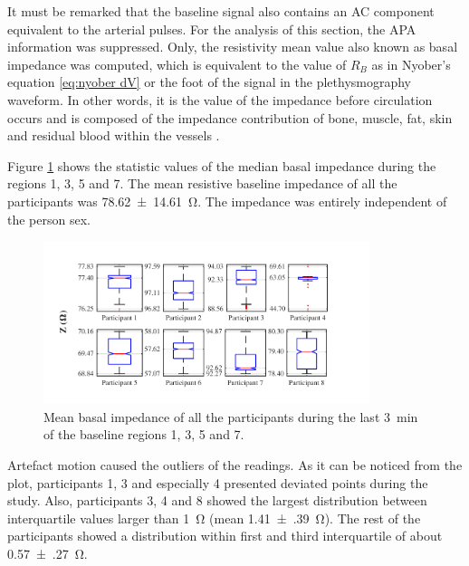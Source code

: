 It must be remarked that the baseline signal also contains an AC component equivalent to the arterial pulses. For the analysis of this section, the APA information was suppressed. Only, the resistivity mean value also known as basal impedance was computed, which is equivalent to the value of $R_B$ as in Nyober's equation \ref{eq:nyober dV} or the foot of the signal in the plethysmography waveform. In other words, it is the value of the impedance before circulation occurs and is composed of the impedance contribution of bone, muscle, fat, skin and residual blood within the vessels \cite{dai2009vivo}. 

Figure \ref{fig:Basal statistics} shows the statistic values of the median basal impedance during the regions 1, 3, 5 and 7. The mean resistive baseline impedance of all the participants was \SI{78.62(1461)}{\ohm}. The impedance was entirely independent of the person sex.  

\begin{figure}[!htbp]
	\centering
	\includegraphics[width=0.85\textwidth,keepaspectratio]{figure_b_1}    
	\caption[Mean basal impedance boxplot]{Mean basal impedance of all the participants during the last \SI{3}{\minute} of the baseline regions 1, 3, 5 and 7.}
	\label{fig:Basal statistics} 
\end{figure}

Artefact motion caused the outliers of the readings. As it can be noticed from the plot, participants 1, 3 and especially 4 presented deviated points during the study. Also, participants 3, 4 and 8 showed the largest distribution between interquartile values larger than \SI{1}{\ohm} (mean \SI{1.41(39)}{\ohm}). The rest of the participants showed a distribution within first and third interquartile of about \SI{0.57(27)}{\ohm}. 

